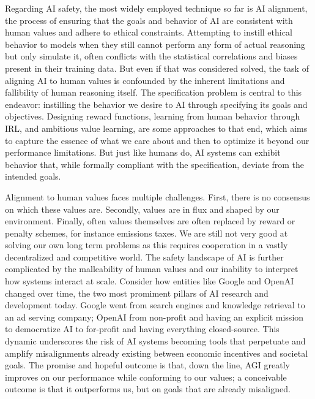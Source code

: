 Regarding \gls{AI} safety, the most widely employed technique so far is \gls{AI} alignment, the process of ensuring that the goals and behavior of \gls{AI} are consistent with human values and adhere to ethical constraints.
Attempting to instill ethical behavior to models when they still cannot perform any form of actual reasoning but only simulate it, often conflicts with the statistical correlations and biases present in their training data.
But even if that was considered solved, the task of aligning AI to human values is confounded by the inherent limitations and fallibility of human reasoning itself.
The specification problem is central to this endeavor: instilling the behavior we desire to \gls{AI} through specifying its goals and objectives.
Designing reward functions, learning from human behavior through \gls{IRL}, and ambitious value learning, are some approaches to that end, which aims to capture the essence of what we care about and then to optimize it beyond our performance limitations.
But just like humans do, AI systems can exhibit behavior that, while formally compliant with the specification, deviate from the intended goals. 

Alignment to human values faces multiple challenges.
First, there is no consensus on which these values are.
Secondly, values are in flux and shaped by our environment.
Finally, often values themselves are often replaced by reward or penalty schemes, for instance emissions taxes.
We are still not very good at solving our own long term problems as this requires cooperation in a vastly decentralized and competitive world.
The safety landscape of \gls{AI} is further complicated by the malleability of human values and our inability to interpret how systems interact at scale.
Consider how entities like Google and OpenAI changed over time, the two most promiment pillars of \gls{AI} research and development today.
Google went from search engines and knowledge retrieval to an ad serving company; OpenAI from non-profit and having an explicit mission to democratize \gls{AI} to for-profit and having everything closed-source.
This dynamic underscores the risk of AI systems becoming tools that perpetuate and amplify misalignments already existing between economic incentives and societal goals.
The promise and hopeful outcome is that, down the line, \gls{AGI} greatly improves on our performance while conforming to our values; a conceivable outcome is that it outperforms us, but on goals that are already misaligned.

